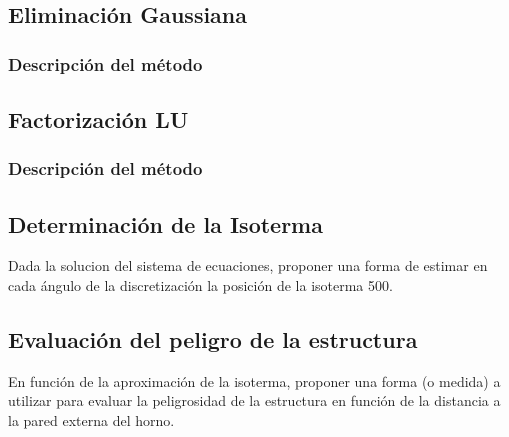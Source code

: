 \subsection{Eliminación Gaussiana}

\subsubsection{Descripción del método}

\subsection{Factorización LU}

\subsubsection{Descripción del método}

\subsection{Determinación de la Isoterma}

Dada la solucion del sistema de ecuaciones, proponer una forma de estimar en cada ángulo de la discretización la posición de la isoterma 500.

\subsection{Evaluación del peligro de la estructura}

En función de la aproximación de la isoterma, proponer una forma (o medida) a utilizar para evaluar la peligrosidad de la estructura en función de la distancia a la pared externa del horno.
